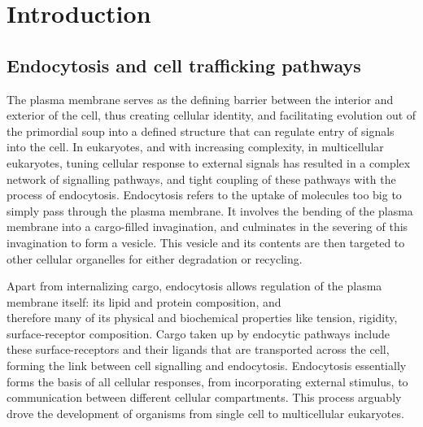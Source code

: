 \chapter{Introduction} %
\graphicspath{ {/Users/kaksonenlab/Desktop/figures/} }
\label{Ch:Intro} %

\section{Endocytosis and cell trafficking pathways}
The plasma membrane serves as the defining barrier between the interior and exterior of the cell, thus creating cellular identity, and facilitating evolution out of the primordial soup into a defined structure that can regulate entry of signals into the cell. In eukaryotes, and with increasing complexity, in multicellular eukaryotes, tuning cellular response to external signals has resulted in a complex network of signalling pathways, and tight coupling of these pathways with the process of endocytosis. Endocytosis refers to the uptake of molecules too big to simply pass through the plasma membrane. It involves the bending of the plasma membrane into a cargo-filled invagination, and culminates in the severing of this invagination to form a vesicle. This vesicle and its contents are then targeted to other cellular organelles for either degradation or recycling. 


\vspace{5mm}

Apart from internalizing cargo, endocytosis allows regulation of the plasma membrane itself: its lipid and protein composition, and\\ therefore many of its physical and biochemical properties like tension, rigidity, surface-receptor composition. Cargo taken up by endocytic pathways include these surface-receptors and their ligands that are transported across the cell, forming the link between cell signalling and endocytosis.
Endocytosis essentially forms the basis of all cellular responses, from incorporating external stimulus, to communication between different cellular compartments. This process arguably drove the development of organisms from single cell to multicellular eukaryotes.  




